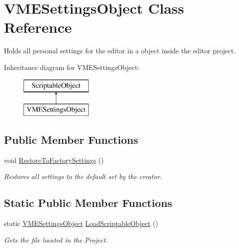 \hypertarget{class_v_m_e_settings_object}{}\section{V\+M\+E\+Settings\+Object Class Reference}
\label{class_v_m_e_settings_object}


Holds all personal settings for the editor in a object inside the editor project.  


Inheritance diagram for V\+M\+E\+Settings\+Object\+:\begin{figure}[H]
\begin{center}
\leavevmode
\includegraphics[height=2.000000cm]{class_v_m_e_settings_object}
\end{center}
\end{figure}
\subsection*{Public Member Functions}
\begin{DoxyCompactItemize}
\item 
void \hyperlink{class_v_m_e_settings_object_a8acba564b96c8d11c48119fa31ffa24b}{Restore\+To\+Factory\+Settings} ()
\begin{DoxyCompactList}\small\item\em Restores all settings to the default set by the creator. \end{DoxyCompactList}\end{DoxyCompactItemize}
\subsection*{Static Public Member Functions}
\begin{DoxyCompactItemize}
\item 
static \hyperlink{class_v_m_e_settings_object}{V\+M\+E\+Settings\+Object} \hyperlink{class_v_m_e_settings_object_a6e1b8fb3edc8c65774391cde2773cafa}{Load\+Scriptable\+Object} ()
\begin{DoxyCompactList}\small\item\em Gets the file located in the Project. \end{DoxyCompactList}\end{DoxyCompactItemize}
